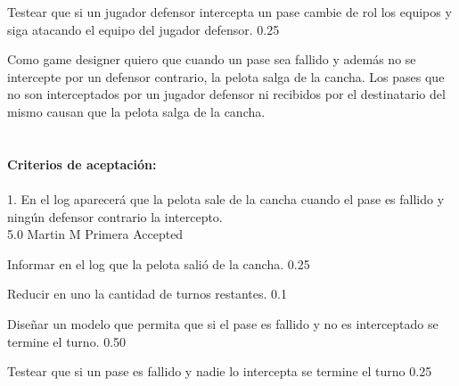 		{Testear que si un jugador defensor intercepta un pase cambie de rol los equipos y siga atacando el equipo del jugador defensor.} %
		{} %
		{0.25} %
		{} %
		{} %
		{} %
\vspace{20pt}


	{Como game designer quiero que cuando un pase sea fallido y adem\'as no se intercepte por un defensor contrario, la pelota salga de la cancha.} %
	{Los pases que no son interceptados por un jugador defensor ni recibidos por el destinatario del mismo causan que la pelota salga de la cancha. \\
  \\
  \\
\textbf{Criterios de aceptación:}\\
  \\
1. En el log aparecerá que la pelota sale de la cancha cuando el pase es fallido y ningún defensor contrario la intercepto. \\
} %
	{} %
	{5.0} %
	{Martin M} %
	{Primera} %
	{Accepted} %

		{Informar en el log que la pelota salió de la cancha.} %
		{} %
		{0.25} %
		{} %
		{} %
		{} %

		{Reducir en uno la cantidad de turnos restantes.} %
		{} %
		{0.1} %
		{} %
		{} %
		{} %

		{Diseñar un modelo que permita que si el pase es fallido y no es interceptado se termine el turno.} %
		{} %
		{0.50} %
		{} %
		{} %
		{} %


		{Testear que si un pase es fallido y nadie lo intercepta se termine el turno} %
		{} %
		{0.25} %
		{} %
		{} %
		{} %


\vspace{20pt}


